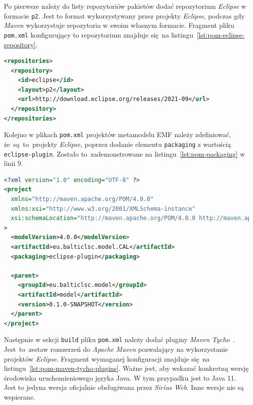 Po pierwsze należy do listy repozytoriów pakietów dodać repozytorium
\emph{Eclipse} w formacie \texttt{p2}. Jest to format wykorzystywany przez
projekty \emph{Eclipse}, podczas gdy \emph{Maven} wykorzystuje repozytoria w
swoim własnym formacie. Fragment pliku \texttt{pom.xml} konfigurujący to
repozytorium znajduje się na listingu~\ref{lst:pom-eclipse-repository}.

\begin{lstlisting}[language=XML,
    caption={Konfiguracja repozytorium \emph{Eclipse} w \texttt{pom.xml}.},
    label={lst:pom-eclipse-repository}]
<repositories>
  <repository>
    <id>eclipse</id>
    <layout>p2</layout>
    <url>http://download.eclipse.org/releases/2021-09</url>
  </repository>
</repositories>
\end{lstlisting}

Kolejno w plikach \texttt{pom.xml} projektów metamodelu \gls{EMF} należy
zdefiniować, że~są~to~projekty \emph{Eclipse}, poprzez dodanie elementu
\texttt{packaging} z wartością \texttt{eclipse-plugin}. Zostało
to~zademonstrowane na listingu~\ref{lst:pom-packaging} w linii 9.

\begin{lstlisting}[language=XML,
    caption={Plik \texttt{pom.xml} dla jednego z projektów metamodelu
      \gls{EMF}.},
    label={lst:pom-packaging}]
<?xml version="1.0" encoding="UTF-8" ?>
<project
  xmlns="http://maven.apache.org/POM/4.0.0"
  xmlns:xsi="http://www.w3.org/2001/XMLSchema-instance"
  xsi:schemaLocation="http://maven.apache.org/POM/4.0.0 http://maven.apache.org/xsd/maven-4.0.0.xsd"
>
  <modelVersion>4.0.0</modelVersion>
  <artifactId>eu.balticlsc.model.CAL</artifactId>
  <packaging>eclipse-plugin</packaging>

  <parent>
    <groupId>eu.balticlsc.model</groupId>
    <artifactId>model</artifactId>
    <version>0.1.0-SNAPSHOT</version>
  </parent>
</project>
\end{lstlisting}

Następnie w sekcji \texttt{build} pliku \texttt{pom.xml} należy dodać pluginy
\emph{Maven Tycho}~\cite{maven-tycho-homepage}. Jest~to~zestaw rozszerzeń do
\emph{Apache Maven}
pozwalający na wykorzystanie projektów \emph{Eclipse}. Fragment
wymaganej konfiguracji znajduje się na
listingu~\ref{lst:pom-maven-tycho-plugins}. Ważne jest, aby wskazać konkretną
wersję środowiska uruchomieniowego języka Java. W tym przypadku jest to Java
11. Jest to jedyna wersja oficjalnie obsługiwana przez \emph{Sirius Web}.
Inne wersje nie są wspierane.

